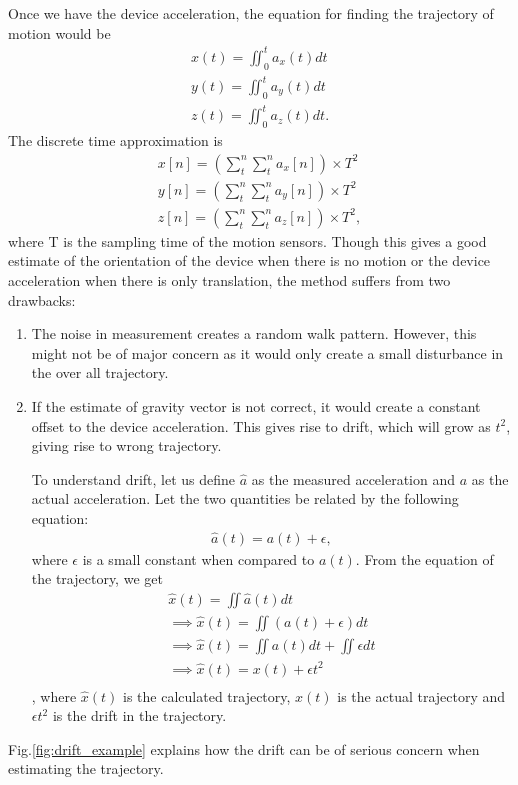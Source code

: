 \documentclass[BTech]{iitmdiss}
\begin{document}
Once we have the device acceleration, the equation for finding the 
trajectory of motion would be
\begin{align}
x(t)=\iint_0^{t}{a_x(t)dt}\\
y(t)=\iint_0^{t}{a_y(t)dt}\\
z(t)=\iint_0^{t}{a_z(t)dt}.
\end{align}
The discrete time approximation is
\begin{align}
x[n]=({\sum_{t}^{n}}{\sum_{t}^{n}}a_x[n]){\times}T^2\\
y[n]=({\sum_{t}^{n}}{\sum_{t}^{n}}a_y[n]){\times}T^2\\
z[n]=({\sum_{t}^{n}}{\sum_{t}^{n}}a_z[n]){\times}T^2,
\end{align}
where T is the sampling time of the motion sensors.
Though this gives a good estimate of the orientation of the device when
there is no motion or the device acceleration when there is only
translation, the method suffers from two drawbacks:
\begin{enumerate}
\item The noise in measurement creates a random walk pattern. However, 
this might not be of major concern as it would only create a small disturbance in the over all trajectory.
\item If the estimate of gravity vector is not correct, it would create
a constant offset to the device acceleration. This gives rise to drift, which
will grow as $t^2$, giving rise to wrong trajectory.

To understand drift, let us define $\hat{a}$ as the measured acceleration
and $a$ as the actual acceleration. Let the two quantities be related by
the following equation:
\begin{align}
\hat{a}(t) = a(t) + \epsilon,
\end{align}
where $\epsilon$ is a small constant when compared to $a(t)$. From the equation of the trajectory, we get
\begin{align}
\hat{x}(t) = \iint\hat{a}(t)dt\\
\implies \hat{x}(t) = \iint(a(t)+\epsilon)dt\\
\implies \hat{x}(t) = {\iint}a(t)dt+\iint{\epsilon}dt\\
\implies \hat{x}(t) = x(t)+{\epsilon}t^2\\
\end{align},
where $\hat{x}(t)$ is the calculated trajectory, $x(t)$ is the actual 
trajectory and ${\epsilon}t^2$ is the drift in the trajectory.
\end{enumerate}
Fig.\ref{fig:drift_example} explains how the drift can be of serious concern when
estimating the trajectory. 
\end{document}
